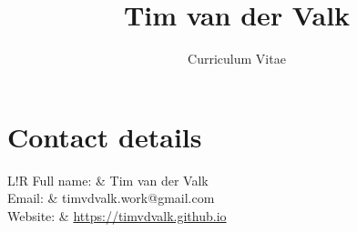 \documentclass[9pt]{article}
\title{\bfseries\Huge Tim van der Valk}
\author{Curriculum Vitae}
\date{}
\newcommand\VRule{\color{lightgray}\vrule width 0.5pt}
\begin{document}
\maketitle


\vspace{-0pt}
\section*{Contact details}
\vspace{-3pt}\begin{tabular}{L!{\VRule}R}
	Full name: & Tim van der Valk \\
	Email: & timvdvalk.work@gmail.com \\[2pt]
	Website: & \url{https://timvdvalk.github.io} \\\\[2pt]
\end{tabular}




\end{document}
